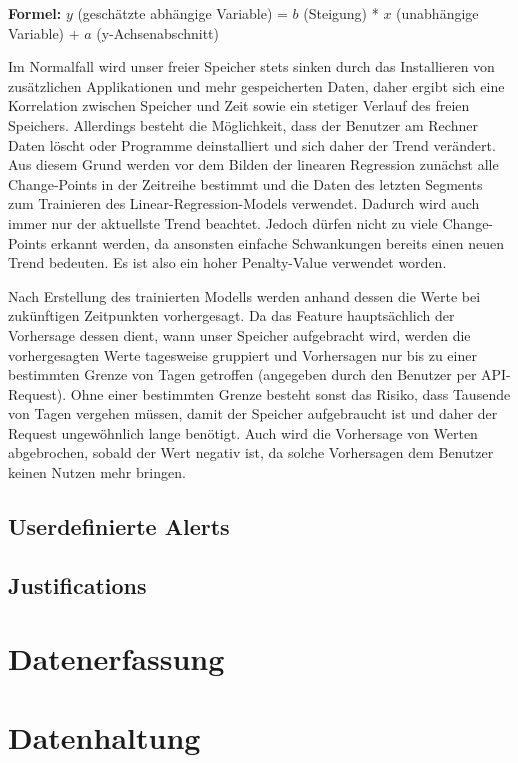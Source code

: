 \documentclass{report}
\begin{document}
 
\textbf{Formel:} \( y \) (geschätzte abhängige Variable) = \( b \) (Steigung) * \( x \) (unabhängige Variable) + \( a \) (y-Achsenabschnitt)\newline


Im Normalfall wird unser freier Speicher stets sinken durch das Installieren von zusätzlichen Applikationen und mehr gespeicherten Daten, daher ergibt sich eine Korrelation zwischen Speicher und Zeit sowie ein stetiger Verlauf des freien Speichers. Allerdings besteht die Möglichkeit, dass der Benutzer am Rechner Daten löscht oder Programme deinstalliert und sich daher der Trend verändert.
Aus diesem Grund werden vor dem Bilden der linearen Regression zunächst alle Change-Points in der Zeitreihe bestimmt und die Daten des letzten Segments zum Trainieren des Linear-Regression-Models verwendet. Dadurch wird auch immer nur der aktuellste Trend beachtet. Jedoch dürfen nicht zu viele Change-Points erkannt werden, da ansonsten einfache Schwankungen bereits einen neuen Trend bedeuten. Es ist also ein hoher Penalty-Value verwendet worden.\newline


Nach Erstellung des trainierten Modells werden anhand dessen die Werte bei zukünftigen Zeitpunkten vorhergesagt. Da das Feature hauptsächlich der Vorhersage dessen dient, wann unser Speicher aufgebracht wird, werden die vorhergesagten Werte tagesweise gruppiert und Vorhersagen nur bis zu einer bestimmten Grenze von Tagen getroffen (angegeben durch den Benutzer per API-Request).
Ohne einer bestimmten Grenze besteht sonst das Risiko, dass Tausende von Tagen vergehen müssen, damit der Speicher aufgebraucht ist und daher der Request ungewöhnlich lange benötigt. Auch wird die Vorhersage von Werten abgebrochen, sobald der Wert negativ ist, da solche Vorhersagen dem Benutzer keinen Nutzen mehr bringen.
\subsection{Userdefinierte Alerts}
\subsection{Justifications}
\section{Datenerfassung}
\section{Datenhaltung}
\end{document}

